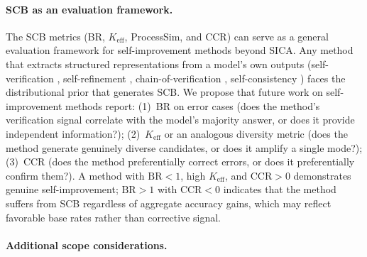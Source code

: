 \paragraph{SCB as an evaluation framework.}
\label{app:scb-evaluation}
The SCB metrics (BR, $K_\text{eff}$, ProcessSim, and CCR) can serve as a general evaluation framework for self-improvement methods beyond SICA. Any method that extracts structured representations from a model's own outputs (self-verification \citep{huang2024selfcorrect}, self-refinement \citep{madaan2023selfrefine}, chain-of-verification \citep{dhuliawala2023chainofverification}, self-consistency \citep{wang2023sc}) faces the distributional prior that generates SCB. We propose that future work on self-improvement methods report: (1)~BR on error cases (does the method's verification signal correlate with the model's majority answer, or does it provide independent information?); (2)~$K_\text{eff}$ or an analogous diversity metric (does the method generate genuinely diverse candidates, or does it amplify a single mode?); (3)~CCR (does the method preferentially correct errors, or does it preferentially confirm them?). A method with $\text{BR} < 1$, high $K_\text{eff}$, and $\text{CCR} > 0$ demonstrates genuine self-improvement; $\text{BR} > 1$ with $\text{CCR} < 0$ indicates that the method suffers from SCB regardless of aggregate accuracy gains, which may reflect favorable base rates rather than corrective signal.

\paragraph{Additional scope considerations.}

